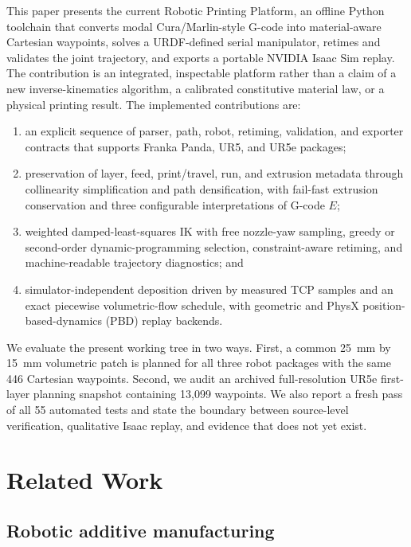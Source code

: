 \documentclass[letterpaper,10pt,conference]{ieeeconf}
\newcommand{\RPP}{Robotic Printing Platform}
\begin{document}
This paper presents the current \RPP{}, an offline Python toolchain that converts
modal Cura/Marlin-style G-code into material-aware Cartesian waypoints, solves a
URDF-defined serial manipulator, retimes and validates the joint trajectory, and
exports a portable NVIDIA Isaac Sim replay.  The contribution is an integrated,
inspectable platform rather than a claim of a new inverse-kinematics algorithm,
a calibrated constitutive material law, or a physical printing result.  The
implemented contributions are:

\begin{enumerate}
  \item an explicit sequence of parser, path, robot, retiming, validation, and
  exporter contracts that supports Franka Panda, UR5, and UR5e packages;
  \item preservation of layer, feed, print/travel, run, and extrusion metadata
  through collinearity simplification and path densification, with fail-fast
  extrusion conservation and three configurable interpretations of G-code
  \(E\);
  \item weighted damped-least-squares IK with free nozzle-yaw sampling, greedy
  or second-order dynamic-programming selection, constraint-aware retiming, and
  machine-readable trajectory diagnostics; and
  \item simulator-independent deposition driven by measured TCP samples and an
  exact piecewise volumetric-flow schedule, with geometric and PhysX
  position-based-dynamics (PBD) replay backends.
\end{enumerate}

We evaluate the present working tree in two ways.  First, a common
\SI{25}{\milli\meter} by \SI{15}{\milli\meter} volumetric patch is planned for
all three robot packages with the same 446 Cartesian waypoints.  Second, we
audit an archived full-resolution UR5e first-layer planning snapshot containing
13,099 waypoints.  We also report a fresh pass of all 55 automated tests and
state the boundary between source-level verification, qualitative Isaac replay,
and evidence that does not yet exist.

\section{Related Work}

\subsection{Robotic additive manufacturing}
\end{document}
